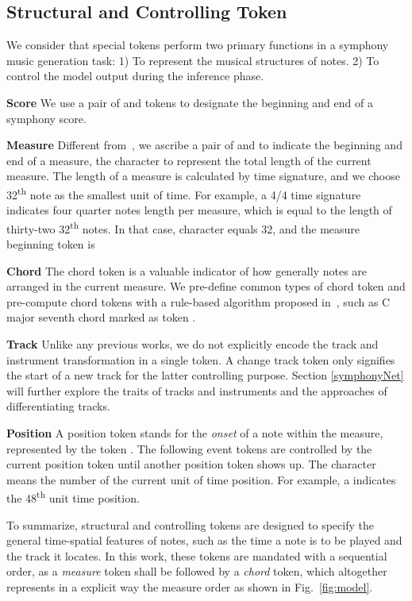 \documentclass{article}
\begin{document}
\subsection{Structural and Controlling Token}
We consider that special tokens perform two primary functions in a symphony music generation task: 1) To represent the musical structures of notes. 2) To control the model output during the inference phase.

\textbf{Score} We use a pair of  and  tokens to designate the beginning and end of a symphony score.

\textbf{Measure} Different from~\cite{popmag,popmt}, we ascribe a pair of  and  to indicate the beginning and end of a measure, the character  to represent the total length of the current measure. The length of a measure is calculated by time signature, and we choose 32\textsuperscript{th} note as the smallest unit of time. For example, a 4/4 time signature indicates four quarter notes length per measure, which is equal to the length of thirty-two 32\textsuperscript{th} notes. In that case, character  equals 32, and the measure beginning token is  

\textbf{Chord} The chord token is a valuable indicator of how generally notes are arranged in the current measure. We pre-define  common types of chord token and pre-compute chord tokens with a rule-based algorithm proposed in~\cite{cwt}, such as C major seventh chord marked as token .

\textbf{Track} Unlike any previous works, we do not explicitly encode the track and instrument transformation in a single token. A change track token  only signifies the start of a new track for the latter controlling purpose. Section \ref{symphonyNet} will further explore the traits of tracks and instruments and the approaches of differentiating tracks.

\textbf{Position} A position token stands for the \emph{onset} of a note within the measure, represented by the token . The following event tokens are controlled by the current position token until another position token shows up. The character  means the number of the current unit of time position. For example, a   indicates the 48\textsuperscript{th} unit time position.

To summarize, structural and controlling tokens are designed to specify the general time-spatial features of notes, such as the time a note is to be played and the track it locates. In this work, these tokens are mandated with a sequential order, as a \emph{measure} token shall be followed by a \emph{chord} token, which altogether represents in a explicit way the measure order as shown in Fig.~\ref{fig:model}.
\end{document}
